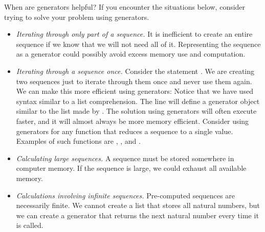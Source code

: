 When are generators helpful?
If you encounter the situations below, consider trying to solve
your problem using generators.
\begin{itemize}
\item \emph{Iterating through only part of a sequence.}
It is inefficient to create an entire sequence if we know that we will not need all of it.
Representing the sequence as a generator could possibly avoid excess memory use and computation.
\item \emph{Iterating through a sequence once.} Consider the statement
.
We are creating two sequences just to iterate through them once and never use them again.
We can make this more efficient using generators:
Notice that we have used syntax similar to a list comprehension.
The line  will define a generator object similar to the list made by \li{[i for i in xrange(1000) if i\%2 == 0]}.
The solution using generators will often execute faster, and it will almost always be more memory efficient.  Consider using generators for any function that reduces a sequence to a single value.  Examples of such functions are , , and .
\item \emph{Calculating large sequences.}  A sequence must be stored somewhere in computer memory.
If the sequence is large, we could exhaust all available memory.
\item \emph{Calculations involving infinite sequences.}  Pre-computed sequences are necessarily finite.  We cannot create a list that stores all natural numbers, but we can create a generator that returns the next natural number every time it is called.
\end{itemize}

